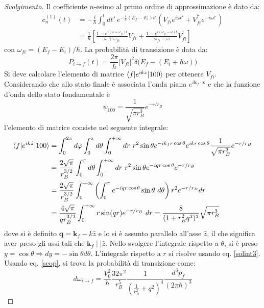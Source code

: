 \documentclass[11pt, a4paper]{scrartcl} %
\numberwithin{equation}{subsection}
\theoremstyle{style2}
\theoremstyle{style1}
\renewcommand\qedsymbol{$\blacksquare$}
\newenvironment{svolgimento}{\renewcommand\qedsymbol{$\spadesuit$}\begin{proof}[Svolgimento]}{\end{proof}}
\begin{document}
\begin{svolgimento}
	Il coefficiente $n$-esimo al primo ordine di approssimazione \`e dato da:
	\[
		\begin{split}
			c^{(1)} _n (t) &=-\frac{i}{\hbar } \int_0^t dt ' \ e^{-\frac{i}{\hbar }(E_f-E_i) t'} \left(V_{fi} e^{i\omega t'} + V_{fi} ^\dagger e^{-i\omega t'} \right)  \\
				       &= \frac{1}{\hbar } \left[\frac{1- e^{i(\omega +\omega_{fi} ) t } }{\omega+\omega_{fi}}V_{fi} + \frac{1- e^{i(\omega_{fi } -\omega)t} }{\omega_{fi} -\omega }V_{fi} ^\dagger \right] 
		\end{split}
	\] 
	con $\omega_{fi} = (E_f-E_i)/\hbar $.
La probabilit\`a di transizione \`e data da:
\[
P_{i\to f} (t) = \frac{2\pi}{\hbar } \lvert V_{fi}  \rvert ^2 \delta  \big(E_f -(E_i + \hbar \omega) \big)
\] 
Si deve calcolare l'elemento di matrice $\braket{f|e^{ikz} |100} $ per ottenere $V_{fi} $. 
Considerando che allo stato finale \`e associata l'onda piana $e^{i \mathbf{k} _f \cdot \mathbf{x} } $ e che la funzione d'onda dello stato fondamentale \`e
\[
\psi _{100} = \frac{1}{\sqrt{\pi r_B^3} } e^{-r /r_B} 
\] 
l'elemento di matrice consiste nel seguente integrale:
\[
	\begin{split}
		\braket{f|e^{ik \hat{z}} |100}&= \int_{0} ^{2\pi} d\varphi \int_{0} ^\pi d\theta \int_{0} ^{+\infty} dr \ r^2 \sin \theta e^{- i k_f r \cos \theta } e^{ik r \cos \theta } \frac{1}{\sqrt{\pi  r_B^3} }e^{-r / r_B} \\
					      &= \frac{2 \sqrt{\pi} }{r_B^{3 / 2} } \int_{0} ^\pi d\theta \int_{0} ^{+\infty} dr \ r ^2 \sin \theta  e^{-i q r \cos \theta} e^{ - r / r_B} \\
					       &= \frac{2\sqrt{\pi} }{r_B^{ 3 / 2} } \int_{0} ^{+\infty}\left( \int_{0} ^\pi e^{-i  q r \cos \theta } \sin \theta  \ d  \theta \right)r^2 e^{-r / r_B}  dr \\
					      &= \frac{4 \sqrt{\pi} }{qr_B^{3 / 2} } \int_{0} ^{+\infty} r \sin (qr)e^{-r / r_B} \ dr = \frac{8  }{(1+r_B^2  q^2 )^2}\sqrt{\pi r_B^3}
	\end{split}
\] 
dove si \`e definito $\mathbf{q} = \mathbf{k} _f - k \hat{z} $ e lo si \`e assunto parallelo all'asse $\hat{z}$, il che significa aver preso gli assi tali che $\mathbf{k} _f  \mid  \mid \hat{z}$.
Nello svolgere l'integrale rispetto a $\theta $, si \`e preso $y = \cos \theta \Rightarrow dy = - \sin \theta  d\theta $.
L'integrale rispetto a $r$ si risolve usando eq. \ref{solint3}.
Usando eq. \ref{scop}, si trova la probabilit\`a di transizione come:
\[
d \omega_{i\to f} = \frac{V_0^2}{\hbar }\frac{32 \pi^2}{r_B^5} \frac{1}{\left(\frac{1}{r_B^2}+ q^2\right)^4 } \frac{d^3p_f}{(2\pi\hbar )^3}
\]
\end{svolgimento}
\end{document}

